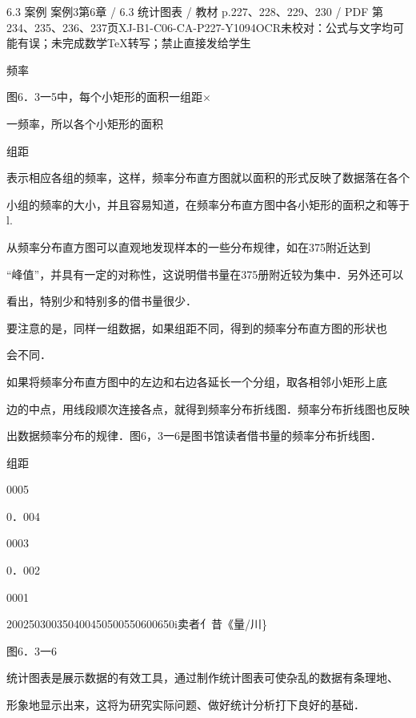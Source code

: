 \begin{bankitem}{6.3 案例 案例3}{第6章 / 6.3 统计图表 / 教材 p.227、228、229、230 / PDF 第234、235、236、237页}{XJ-B1-C06-CA-P227-Y1094}{OCR未校对：公式与文字均可能有误；未完成数学TeX转写；禁止直接发给学生}
\begin{ocrdraft}
频率
\par
图6．3一5中，每个小矩形的面积一组距\ensuremath{\times}
\par
一频率，所以各个小矩形的面积
\par
组距
\par
表示相应各组的频率，这样，频率分布直方图就以面积的形式反映了数据落在各个
\par
小组的频率的大小，并且容易知道，在频率分布直方图中各小矩形的面积之和等于l.
\par
从频率分布直方图可以直观地发现样本的一些分布规律，如在375附近达到
\par
“峰值”，并具有一定的对称性，这说明借书量在375册附近较为集中．另外还可以
\par
看出，特别少和特别多的借书量很少．
\par
要注意的是，同样一组数据，如果组距不同，得到的频率分布直方图的形状也
\par
[教材p.230 / PDF第237页]
\par
会不同．
\par
如果将频率分布直方图中的左边和右边各延长一个分组，取各相邻小矩形上底
\par
边的中点，用线段顺次连接各点，就得到频率分布折线图．频率分布折线图也反映
\par
出数据频率分布的规律．图6，3一6是图书馆读者借书量的频率分布折线图．
\par
组距
\par
0005
\par
0．004
\par
0003
\par
0．002
\par
0001
\par
200250300350400450500550600650i卖者亻昔《量/川\}
\par
图6．3一6
\par
统计图表是展示数据的有效工具，通过制作统计图表可使杂乱的数据有条理地、
\par
形象地显示出来，这将为研究实际问题、做好统计分析打下良好的基础．
\end{ocrdraft}
\end{bankitem}
